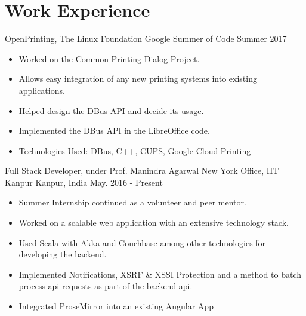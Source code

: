 \section*{\sc Work Experience}
\vspace{-2mm}
\hrulefill
\vspace{2mm}

\cventry
{OpenPrinting, The Linux Foundation}
{Google Summer of Code}
{}
{Summer 2017}
{
  \begin{itemize}
  \item Worked on the Common Printing Dialog Project.
  \item Allows easy integration of any new printing systems into existing applications.
  \item Helped design the DBus API and decide its usage.
  \item Implemented the DBus API in the LibreOffice code.
  \item Technologies Used: DBus, C++, CUPS, Google Cloud Printing
  \end{itemize}
}

\cventry
{Full Stack Developer, under Prof. Manindra Agarwal}
{New York Office, IIT Kanpur}
{Kanpur, India}
{May. 2016 - Present}
{
  \begin{itemize}
  \item Summer Internship continued as a volunteer and peer mentor.
  \item Worked on a scalable web application with an extensive technology stack.
  \item Used Scala with Akka and Couchbase among other technologies for
    developing the backend.
  \item	Implemented Notifications, XSRF \& XSSI Protection and a method
    to batch process api requests as part of the backend api.
  \item Integrated ProseMirror into an existing Angular App
  \end{itemize}
}
